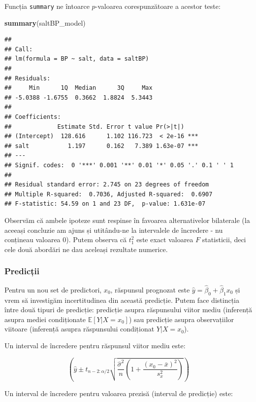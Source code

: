 \documentclass[]{article}
\newenvironment{Shaded}{\begin{snugshade}}{\end{snugshade}}
\newcommand{\KeywordTok}[1]{\textcolor[rgb]{0.13,0.29,0.53}{\textbf{{#1}}}}
\newcommand{\NormalTok}[1]{{#1}}
\begin{document}
Funcția \texttt{summary} ne întoarce \(p\)-valoarea corespunzătoare a
acestor teste:

\begin{Shaded}
\begin{Highlighting}[]
\KeywordTok{summary}\NormalTok{(saltBP_model)}
\end{Highlighting}
\end{Shaded}

\begin{verbatim}
## 
## Call:
## lm(formula = BP ~ salt, data = saltBP)
## 
## Residuals:
##     Min      1Q  Median      3Q     Max 
## -5.0388 -1.6755  0.3662  1.8824  5.3443 
## 
## Coefficients:
##             Estimate Std. Error t value Pr(>|t|)    
## (Intercept)  128.616      1.102 116.723  < 2e-16 ***
## salt           1.197      0.162   7.389 1.63e-07 ***
## ---
## Signif. codes:  0 '***' 0.001 '**' 0.01 '*' 0.05 '.' 0.1 ' ' 1
## 
## Residual standard error: 2.745 on 23 degrees of freedom
## Multiple R-squared:  0.7036, Adjusted R-squared:  0.6907 
## F-statistic: 54.59 on 1 and 23 DF,  p-value: 1.631e-07
\end{verbatim}

Observăm că ambele ipoteze sunt respinse în favoarea alternativelor
bilaterale (la aceeași concluzie am ajuns și utitându-ne la intervalele
de încredere - nu conțineau valoarea \(0\)). Putem observa că \(t_1^2\)
este exact valoarea \(F\) statisticii, deci cele două abordări ne dau
aceleași rezultate numerice.

\subsubsection{Predicții}\label{predictii}

Pentru un nou set de predictori, \(x_0\), răspunsul prognozat este
\(\hat{y} = \hat{\beta}_0+\hat{\beta}_1 x_0\) și vrem să investigăm
incertitudinea din această predicție. Putem face distincția între două
tipuri de predicție: predicție asupra răspunsului viitor mediu
(inferență asupra mediei condiționate \(\mathbb{E}[Y|X=x_0]\)) sau
predicție asupra observațiilor viitoare (inferență asupra răspunsului
condiționat \(Y|X=x_0\)).

Un interval de încredere pentru răspunsul viitor mediu este:

\[
\left(\hat y \pm t_{n-2:\alpha/2}\sqrt{\frac{\hat\sigma^2}{n}\left(1+\frac{(x_0-\bar x)^2}{s_x^2}\right)}\right)
\]

Un interval de încredere pentru valoarea prezisă (interval de predicție)
este:
\end{document}
